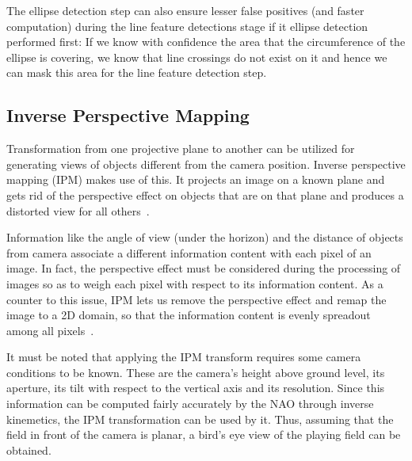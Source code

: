 \documentclass[	DIV=calc,%
							paper=a4,%
							fontsize=9pt,%
							twocolumn]{scrartcl}	 					%
\begin{document}
The ellipse detection step can also ensure lesser false positives (and faster computation) during the line feature detections stage if it ellipse detection performed first: If we know with confidence the area that the circumference of the ellipse is covering, we know that line crossings do not exist on it and hence we can mask this area for the line feature detection step.

\subsection{Inverse Perspective Mapping}
Transformation from one projective plane to another can be utilized for generating views of objects different from the camera position. Inverse perspective mapping (IPM) makes use of this. It projects an image on a known plane and gets rid of the perspective effect on objects that are on that plane and produces a distorted view for all others~\cite{IPM2}.

Information like the angle of view (under the horizon) and the distance of objects from camera associate a different information content with each pixel of an image. In fact, the perspective effect must be considered during the processing of images so as to weigh each pixel with respect to its information content. As a counter to this issue, IPM lets us remove the perspective effect and remap the image to a 2D domain, so that the information content is evenly spreadout among all pixels~\cite{IPMWeb}. 

It must be noted that applying the IPM transform requires some camera conditions to be known. These are the camera's height above ground level, its aperture, its tilt with respect to the vertical axis and its resolution. Since this information can be %
computed fairly accurately by the NAO through inverse kinemetics, the IPM transformation can be used by it. Thus, assuming that the field in front of the camera is planar, a bird's eye view of the playing field can be obtained.
\end{document}
